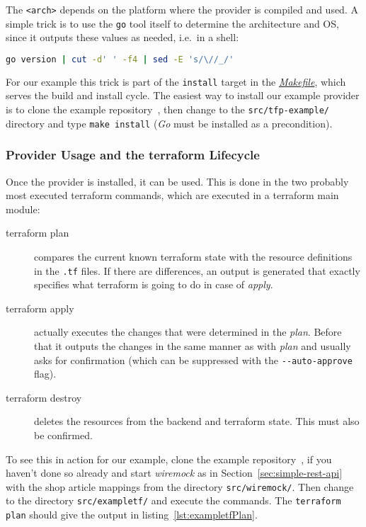 \documentclass[paper=a4,11pt,numbers=noenddot]{article}
\begin{document}
The \verb'<arch>' depends on the platform where the provider is compiled and used. A simple trick is to use the \verb'go' tool itself to determine the architecture and OS, since it outputs these values as needed, i.e.\ in a shell:

\begin{lstlisting}[language=bash,basicstyle=\ttfamily\footnotesize,numbers=none]
go version | cut -d' ' -f4 | sed -E 's/\//_/'
\end{lstlisting}

For our example this trick is part of the \verb'install' target in the \href{https://github.com/ecky-l/terraform-provider-example/blob/main/src/tfp-example/Makefile}{\emph{Makefile}}, which serves the build and install cycle. The easiest way to install our example provider is to clone the example repository~\autocite{ecky-l_terraform-provider-example_nodate}, then change to the \verb'src/tfp-example/' directory and type \verb'make install' (\emph{Go} must be installed as a precondition).

\subsubsection{Provider Usage and the terraform Lifecycle}
\label{subsubsec:prov-usage-terr}

Once the provider is installed, it can be used. This is done in the two probably most executed terraform commands, which are executed in a terraform main module:

\begin{description}
\item[terraform plan] compares the current known terraform state with the resource definitions in the \verb'.tf' files. If there are differences, an output is generated that exactly specifies what terraform is going to do in case of \emph{apply}.
\item[terraform apply] actually executes the changes that were determined in the \emph{plan}. Before that it outputs the changes in the same manner as with \emph{plan} and usually asks for confirmation (which can be suppressed with the \verb'--auto-approve' flag).
\item[terraform destroy] deletes the resources from the backend and terraform state. This must also be confirmed.
\end{description}

To see this in action for our example, clone the example repository~\autocite{ecky-l_terraform-provider-example_nodate}, if you haven't done so already and start \emph{wiremock} as in Section~\ref{sec:simple-rest-api} with the shop article mappings from the directory \verb'src/wiremock/'. Then change to the directory \verb'src/exampletf/' and execute the commands. The \verb'terraform plan' should give the output in listing~\ref{lst:exampletfPlan}.
\end{document}
